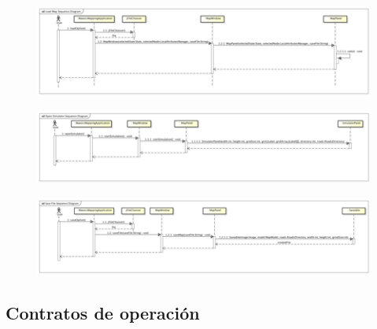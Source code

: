 \documentclass[11pt]{book}
\begin{document}
\begin{figure}[H]
  \centering
    \includegraphics[scale=1]{secuencia11}
\end{figure}
\begin{figure}[H]
  \centering
    \includegraphics[scale=1]{secuencia12}
\end{figure}
\begin{figure}[H]
  \centering
    \includegraphics[scale=1]{secuencia13}
\end{figure}
\subsection{Contratos de operación}
\end{document}
